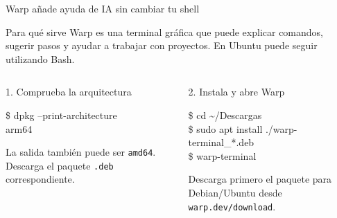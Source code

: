 \documentclass[aspectratio=169,10pt,c]{beamer}
\begin{document}
\begin{frame}{Warp añade ayuda de IA sin cambiar tu shell}
\begin{block}{Para qué sirve}
\small Warp es una terminal gráfica que puede explicar comandos, sugerir pasos y ayudar a trabajar con proyectos. En Ubuntu puede seguir utilizando Bash.
\end{block}
\begin{columns}[T,onlytextwidth]
\begin{exampleblock}{1. Comprueba la arquitectura}
\begin{terminal}
\$ dpkg --print-architecture\\
arm64
\end{terminal}
\small La salida también puede ser \texttt{amd64}. Descarga el paquete \texttt{.deb} correspondiente.
\end{exampleblock}
\begin{exampleblock}{2. Instala y abre Warp}
\begin{terminal}\footnotesize
\$ cd \textasciitilde/Descargas\\
\$ sudo apt install ./warp-terminal\_*.deb\\
\$ warp-terminal
\end{terminal}
\small Descarga primero el paquete para Debian/Ubuntu desde \texttt{warp.dev/download}.
\end{exampleblock}
\end{columns}
\end{frame}
\end{document}

